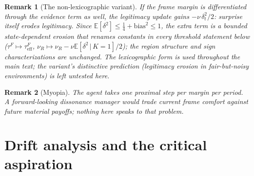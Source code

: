 \documentclass[11pt]{article}
\newtheorem{remark}{Remark}[section]
\newcommand{\E}{\mathbb{E}}
\newcommand{\1}{\mathbf{1}}
\begin{document}
\begin{remark}[The non-lexicographic variant]
\label{r:nonlex}
If the frame margin is differentiated through the evidence term as well, the legitimacy update gains $-\nu\,\delta_t^2/2$: surprise itself erodes legitimacy. Since $\E[\delta^2]\le\tfrac14+\mathrm{bias}^2\le1$, the extra term is a bounded state-dependent erosion that renames constants in every threshold statement below ($\tau^F\mapsto\tau^F_{\mathrm{eff}}$, $\nu_R\mapsto\nu_R-\nu\E[\delta^2\,|\,K{=}1]/2$); the region structure and sign characterizations are unchanged. The lexicographic form is used throughout the main text; the variant's distinctive prediction (legitimacy erosion in fair-but-noisy environments) is left untested here.
\end{remark}

\begin{remark}[Myopia]
The agent takes one proximal step per margin per period. A forward-looking dissonance manager would trade current frame comfort against future material payoffs; nothing here speaks to that problem.
\end{remark}

\section{Drift analysis and the critical aspiration}
\label{s:drift}
\end{document}
